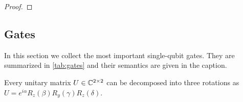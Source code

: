 \begin{proof}
		\end{proof}

		\subsection{Gates}
			In this section we collect the most important single-qubit gates. They are summarized in \autoref{tab:gates} and their semantics are given in the caption.

			\begin{theorem}  \label{th:twoByTwoDecomposition}
				Every unitary matrix \( U \in \mathbb{C}^{2 \times 2} \) can be decomposed into three rotations as \( U = e^{i \alpha} R_z(\beta) R_y(\gamma) R_z(\delta) \).
			\end{theorem}

